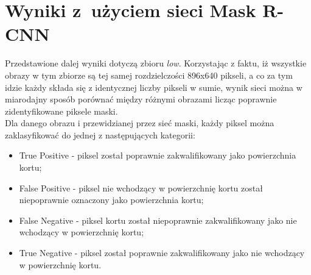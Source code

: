 \newpage
\section{Wyniki z~użyciem sieci Mask R-CNN}

Przedstawione dalej wyniki dotyczą zbioru \textit{low}.
Korzystając z faktu, iż wszystkie obrazy w tym zbiorze są tej samej rozdzielczości 896x640 pikseli, a co za tym idzie każdy składa się z identycznej liczby pikseli w sumie, wynik sieci można w miarodajny sposób porównać między różnymi obrazami licząc poprawnie zidentyfikowane piksele maski. \\
Dla danego obrazu i przewidzianej przez sieć maski, każdy piksel można zaklasyfikować do jednej z następujących kategorii:

\begin{itemize}
  \item True Positive - piksel został poprawnie zakwalifikowany jako powierzchnia kortu;
  \item False Positive - piksel nie wchodzący w powierzchnię kortu został niepoprawnie oznaczony jako powierzchnia kortu;
  \item False Negative - piksel kortu został niepoprawnie zakwalifikowany jako nie wchodzący w powierzchnię kortu;
  \item True Negative - piksel został poprawnie zakwalifikowany jako nie wchodzący w powierzchnię kortu.
\end{itemize}

